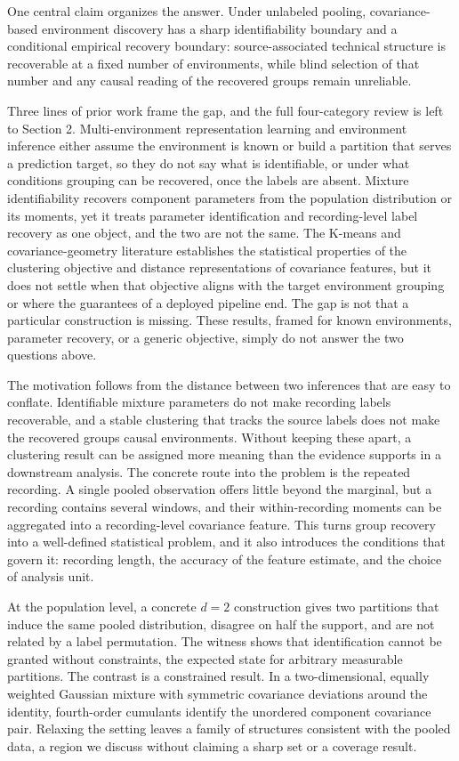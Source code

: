 One central claim organizes the answer. Under unlabeled pooling,
covariance-based environment discovery has a sharp identifiability
boundary and a conditional empirical recovery boundary:
source-associated technical structure is recoverable at a fixed number
of environments, while blind selection of that number and any causal
reading of the recovered groups remain unreliable.

Three lines of prior work frame the gap, and the full four-category
review is left to Section 2. Multi-environment representation learning
and environment inference either assume the environment is known or
build a partition that serves a prediction target, so they do not say
what is identifiable, or under what conditions grouping can be
recovered, once the labels are absent. Mixture identifiability recovers
component parameters from the population distribution or its moments,
yet it treats parameter identification and recording-level label
recovery as one object, and the two are not the same. The K-means and
covariance-geometry literature establishes the statistical properties of
the clustering objective and distance representations of covariance
features, but it does not settle when that objective aligns with the
target environment grouping or where the guarantees of a deployed
pipeline end. The gap is not that a particular construction is missing.
These results, framed for known environments, parameter recovery, or a
generic objective, simply do not answer the two questions above.

The motivation follows from the distance between two inferences that are
easy to conflate. Identifiable mixture parameters do not make recording
labels recoverable, and a stable clustering that tracks the source
labels does not make the recovered groups causal environments. Without
keeping these apart, a clustering result can be assigned more meaning
than the evidence supports in a downstream analysis. The concrete route
into the problem is the repeated recording. A single pooled observation
offers little beyond the marginal, but a recording contains several
windows, and their within-recording moments can be aggregated into a
recording-level covariance feature. This turns group recovery into a
well-defined statistical problem, and it also introduces the conditions
that govern it: recording length, the accuracy of the feature estimate,
and the choice of analysis unit.

At the population level, a concrete \(d=2\) construction gives two
partitions that induce the same pooled distribution, disagree on half
the support, and are not related by a label permutation. The witness
shows that identification cannot be granted without constraints, the
expected state for arbitrary measurable partitions. The contrast is a
constrained result. In a two-dimensional, equally weighted Gaussian
mixture with symmetric covariance deviations around the identity,
fourth-order cumulants identify the unordered component covariance pair.
Relaxing the setting leaves a family of structures consistent with the
pooled data, a region we discuss without claiming a sharp set or a
coverage result.

